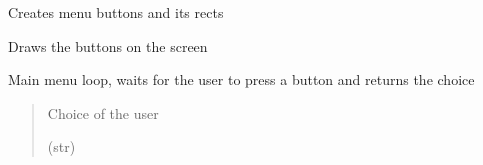\documentclass[letterpaper,10pt,english]{sphinxmanual}
\begin{document}
\begin{fulllineitems}
\begin{fulllineitems}
\end{fulllineitems}


\begin{fulllineitems}
\label{\detokenize{menu:menu.Menu.choice}}
\pysigstartsignatures
{}
\pysigstopsignatures
\end{fulllineitems}


\begin{fulllineitems}
\label{\detokenize{menu:menu.Menu.create_buttons}}
\pysigstartsignatures
{}
\pysigstopsignatures
\sphinxAtStartPar
Creates menu buttons and its rects

\end{fulllineitems}


\begin{fulllineitems}
\label{\detokenize{menu:menu.Menu.draw_buttons}}
\pysigstartsignatures
{}
\pysigstopsignatures
\sphinxAtStartPar
Draws the buttons on the screen

\end{fulllineitems}


\begin{fulllineitems}
\label{\detokenize{menu:menu.Menu.main}}
\pysigstartsignatures
{}
\pysigstopsignatures
\sphinxAtStartPar
Main menu loop, waits for the user to press a button and returns the choice
\begin{quote}\begin{description}
\sphinxAtStartPar
Choice of the user

\sphinxAtStartPar
(str)

\end{description}\end{quote}

\end{fulllineitems}


\end{fulllineitems}
\end{document}
